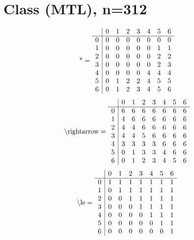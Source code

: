 \documentclass[11pt]{article}
\begin{document}
\section{Class (MTL), n=312}
\[\text{*} = 
\begin{array}{r | r r r r r r r}
 & 0 & 1 & 2 & 3 & 4 & 5 & 6 \\ \hline
0 & 0 & 0 & 0 & 0 & 0 & 0 & 0 \\
1 & 0 & 0 & 0 & 0 & 0 & 1 & 1 \\
2 & 0 & 0 & 0 & 0 & 0 & 2 & 2 \\
3 & 0 & 0 & 0 & 0 & 0 & 2 & 3 \\
4 & 0 & 0 & 0 & 0 & 4 & 4 & 4 \\
5 & 0 & 1 & 2 & 2 & 4 & 5 & 5 \\
6 & 0 & 1 & 2 & 3 & 4 & 5 & 6 \\
\end{array}
\]
\[\text{\textbackslash rightarrow} = 
\begin{array}{r | r r r r r r r}
 & 0 & 1 & 2 & 3 & 4 & 5 & 6 \\ \hline
0 & 6 & 6 & 6 & 6 & 6 & 6 & 6 \\
1 & 4 & 6 & 6 & 6 & 6 & 6 & 6 \\
2 & 4 & 4 & 6 & 6 & 6 & 6 & 6 \\
3 & 4 & 4 & 5 & 6 & 6 & 6 & 6 \\
4 & 3 & 3 & 3 & 3 & 6 & 6 & 6 \\
5 & 0 & 1 & 3 & 3 & 4 & 6 & 6 \\
6 & 0 & 1 & 2 & 3 & 4 & 5 & 6 \\
\end{array}
\]
\[\text{\textbackslash le} = 
\begin{array}{r | r r r r r r r}
 & 0 & 1 & 2 & 3 & 4 & 5 & 6 \\ \hline
0 & 1 & 1 & 1 & 1 & 1 & 1 & 1 \\
1 & 0 & 1 & 1 & 1 & 1 & 1 & 1 \\
2 & 0 & 0 & 1 & 1 & 1 & 1 & 1 \\
3 & 0 & 0 & 0 & 1 & 1 & 1 & 1 \\
4 & 0 & 0 & 0 & 0 & 1 & 1 & 1 \\
5 & 0 & 0 & 0 & 0 & 0 & 1 & 1 \\
6 & 0 & 0 & 0 & 0 & 0 & 0 & 1 \\
\end{array}
\]
\end{document}
